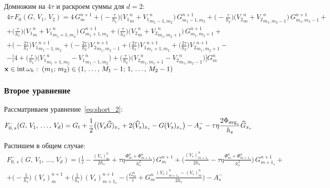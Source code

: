 Домножим на $4\tau$ и раскроем суммы для $d=2$:
\begin{multline*}
4 \tau \, F_0 (G, \, V_1, \, V_2) = 
4 \, G^{n+1}_m
+ \bigg( - \frac{\tau}{h_1} \bigg) \bigg( {V_1}^n_m + {V_1}^n_{m_1 - 1, m_2} \bigg) \, G^{n+1}_{m_1 - 1, m_2}
+ \bigg( - \frac{\tau}{h_2} \bigg) \bigg( {V_2}^n_m + {V_2}^n_{m_1, m_2 - 1} \bigg) \, G^{n+1}_{m_1, m_2 - 1}
+ \\ +
  \bigg(   \frac{\tau}{h_1} \bigg) \bigg( {V_1}^n_m + {V_1}^n_{m_1 + 1, m_2} \bigg) \, G^{n+1}_{m_1 + 1, m_2}
+ \bigg(   \frac{\tau}{h_2} \bigg) \bigg( {V_2}^n_m + {V_2}^n_{m_1, m_2 + 1} \bigg) \, G^{n+1}_{m_1, m_2 + 1}
+ \\ +
  \bigg( -\frac{2\tau}{h_1} \bigg) {V_1}^{n+1}_{m_1 - 1, m_2}
+ \bigg( -\frac{2\tau}{h_2} \bigg) {V_2}^{n+1}_{m_1, m_2 - 1}
+ \bigg(  \frac{2\tau}{h_1} \bigg) {V_1}^{n+1}_{m_1 + 1, m_2}
+ \bigg(  \frac{2\tau}{h_2} \bigg) {V_2}^{n+1}_{m_1, m_2 + 1}
- \\ -
\bigg[ 4
  + \bigg( \frac{\tau}{h_1} \bigg) \bigg( {V_1}^n_{m_1 + 1, m_2} - {V_1}^n_{m_1 - 1, m_2} \bigg)
  + \bigg( \frac{\tau}{h_2} \bigg) \bigg( {V_2}^n_{m_1, m_1 + 1} - {V_2}^n_{m_1, m_2 - 1} \bigg)
\bigg] G^n_m
\end{multline*}
$\vec{x} \in \internal \omega_h :\; (m_1; \, m_2) \in (1, \, \ldots, \, M_1 - 1;\, 1, \, \ldots, \,M_2 - 1)$


\subsubsection{Второе уравнение}
Рассматриваем уравнение~\eqref{eq:short_2}: 
\begin{equation*}
F_{0, \, s}^- (G, \, V_1, \, \ldots, \, V_d) = G_t 
+ \frac{1}{2} \big( (V_s \widehat{G})_{x_s} + 2 (\widehat{V}_s)_{x_s} - G (V_s)_{x_s} \big)
- A_{s}^- - \tau \eta \frac{2 \Phi_{\operatorname{avg}_s}}{h_s} \widehat{G}_{x_s}
\end{equation*}

Распишем в общем случае:
\begin{multline*}
F_{0, \, s}^- (G, \, V_1, \, \ldots, \, V_d) = 
\bigg( \frac{1}{\tau} - \frac{(V_s)^n_m}{2 h_s} + \tau \eta \frac{\Phi^n_m + \Phi^n_{m + 1_s}}{h_s^2} \bigg) \, G^{n+1}_m
+
\bigg( \frac{(V_s)^n_{m + 1_s}}{2 h_s} - \tau \eta \frac{\Phi^n_m + \Phi^n_{m + 1_s}}{h_s^2} \bigg) \, G^{n+1}_{m + 1_s}
+ \\ +
\bigg( - \frac{1}{h_s} \bigg) \, (V_s)^{n+1}_m
+
\bigg( \frac{1}{h_s} \bigg) \, (V_s)^{n+1}_{m + 1_s}
-
\bigg( \frac{G^n_m}{\tau} + G^n_m \frac{(V_s)^n_{m + 1_s} - (V_s)^n_m}{2 h_s} \bigg) - A_{s}^-
\end{multline*}

